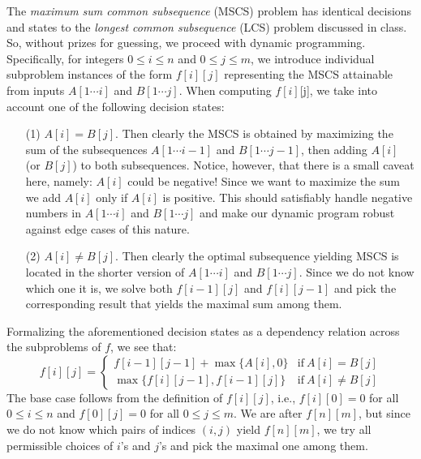 \documentclass[10pt, letterpaper]{article}
\begin{document}
\begin{enumerate}[label={\bfseries Q\arabic*.}]
\begin{enumerate}
        The \textit{maximum sum common subsequence} (MSCS) problem has identical decisions and states
        to the \textit{longest common subsequence} (LCS) problem discussed in class. So, without prizes
        for guessing, we proceed with dynamic programming. Specifically, for integers $0 \leq i \leq n$
        and $0 \leq j \leq m$, we introduce individual subproblem instances of the form $f[i][j]$
        representing the MSCS attainable from inputs $A[1 \cdots i]$ and $B[1 \cdots j]$. When computing
        $f[i]$[j], we take into account one of the following decision states:
        \begin{itemize}
          \item[(1)]
            $A[i] = B[j]$. Then clearly the MSCS is obtained by maximizing the sum of the subsequences
            $A[1 \cdots i-1]$ and $B[1 \cdots j-1]$, then adding $A[i]$ (or $B[j]$) to both subsequences.
            Notice, however, that there is a small caveat here, namely: $A[i]$ could be negative!
            Since we want to maximize the sum we add $A[i]$ only if $A[i]$ is positive. This should
            satisfiably handle negative numbers in $A[1 \cdots i]$ and $B[1 \cdots j]$ and make our dynamic
            program robust against edge cases of this nature.

          \item[(2)]
            $A[i] \neq B[j]$. Then clearly the optimal subsequence yielding MSCS is located in the
            shorter version of $A[1 \cdots i]$ and $B[1 \cdots j]$. Since we do not know which one it
            is, we solve both $f[i-1][j]$ and $f[i][j-1]$ and pick the corresponding result that yields
            the maximal sum among them.
        \end{itemize}
        Formalizing the aforementioned decision states as a dependency relation across the subproblems of
        $f$, we see that:
        \[ 
          f[i][j] = 
          \begin{cases}
            f[i-1][j-1] + \max\big\{A[i], 0\big\} & \text{if}\ A[i] = B[j] \\
            \max\big\{f[i][j-1], f[i-1][j]\big\} & \text{if}\ A[i] \neq B[j]
          \end{cases}
        \]
        The base case follows from the definition of $f[i][j]$, i.e., $f[i][0] = 0$ for all $0 \leq i \leq
        n$ and $f[0][j] = 0$ for all $0 \leq j \leq m$. We are after $f[n][m]$, but since we do not know
        which pairs of indices $(i, j)$ yield $f[n][m]$, we try all permissible choices of $i$'s and $j$'s
        and pick the maximal one among them. \\


\end{enumerate}
\end{enumerate}
\end{document}

